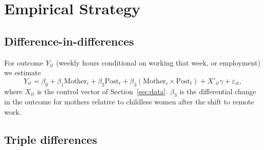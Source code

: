 \documentclass[12pt,a4paper]{article}
\newcommand{\Mother}{\text{Mother}}
\newcommand{\Post}{\text{Post}}
\begin{document}
\section{Empirical Strategy}\label{sec:strategy}

\subsection{Difference-in-differences}

For outcome $Y_{it}$ (weekly hours conditional on working that week, or employment) we estimate
\begin{equation}\label{eq:did}
Y_{it} = \beta_0 + \beta_1 \Mother_i + \beta_2 \Post_t + \beta_3 (\Mother_i \times \Post_t)
+ X'_{it}\gamma + \varepsilon_{it},
\end{equation}
where $X_{it}$ is the control vector of Section~\ref{sec:data}. $\beta_3$ is the differential
change in the outcome for mothers relative to childless women after the shift to remote work.

\subsection{Triple differences}
\end{document}
